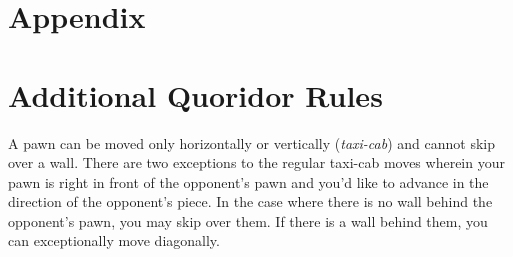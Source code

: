 \documentclass[journal, a4paper]{IEEEtran}
\begin{document}
\newpage
\section{Appendix}\label{sec:appendix}

\section*{Additional Quoridor Rules}\label{sec:quoridor-details}
A pawn can be moved only horizontally or vertically (\textit{taxi-cab}) and cannot skip over a wall. 
There are two exceptions to the regular taxi-cab moves wherein your pawn is right in front of the opponent's pawn and you'd like to advance in the direction of the opponent's piece. In the case where there is no wall behind the opponent's pawn, you may skip over them. If there is a wall behind them, you can exceptionally move diagonally.
\end{document}
